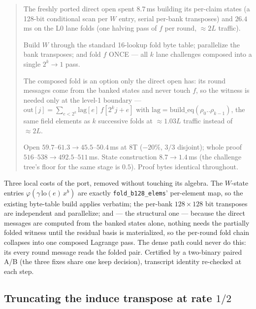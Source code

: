 \documentclass[11pt]{article}
\newcommand{\code}[1]{\texttt{#1}}
\newenvironment{optsummary}{%
  \begin{quote}\small
  \begin{description}
  \setlength{\itemsep}{1pt}\setlength{\parsep}{0pt}\setlength{\topsep}{2pt}
}{%
  \end{description}
  \end{quote}
}
\begin{document}
\begin{optsummary}
\item[Baseline:] The freshly ported direct open spent $8.7\,$ms building its per-claim states (a 128-bit conditional scan per $W$ entry, serial per-bank transposes) and $26.4\,$ms on the L0 lane folds (one halving pass of $f$ per round, $\approx2L$ traffic).
\item[Improvement:] Build $W$ through the standard 16-lookup fold byte table; parallelize the bank transposes; and fold $f$ ONCE --- all $k$ lane challenges composed into a single $2^k{\to}1$ pass.
\item[Mechanism:] The composed fold is an option only the direct open has: its round messages come from the banked states and never touch $f$, so the witness is needed only at the level-1 boundary --- $\mathrm{out}[j] = \sum_{e<2^k}\mathrm{lag}[e]\,f[2^k j{+}e]$ with $\mathrm{lag} = \mathrm{build\_eq}(\rho_0..\rho_{k-1})$, the same field elements as $k$ successive folds at $\approx1.03L$ traffic instead of $\approx2L$.
\item[Result:] Open $59.7$--$61.3\to45.5$--$50.4\,$ms at 8T ($-20\%$, $3/3$ disjoint); whole proof $516$--$538\to492.5$--$511\,$ms. State construction $8.7\to1.4\,$ms (the challenge tree's floor for the same stage is $0.5$). Proof bytes identical throughout.
\end{optsummary}

Three local costs of the port, removed without touching its algebra. The
$W$-state entries $\varphi(\gamma\,\mathrm{lo}(e)\,x^b)$ are exactly
\code{fold\_b128\_elems}' per-element map, so the existing byte-table
build applies verbatim; the per-bank $128{\times}128$ bit transposes are
independent and parallelize; and --- the structural one --- because the
direct messages are computed from the banked states alone, nothing needs
the partially folded witness until the residual basis is materialized, so
the per-round fold chain collapses into one composed Lagrange pass. The
dense path could never do this: its every round message reads the folded
pair. Certified by a two-binary paired A/B (the three fixes share one
keep decision), transcript identity re-checked at each step.

\subsection{Truncating the induce transpose at rate $1/2$}
\label{sec:inducetrunc}
\end{document}

